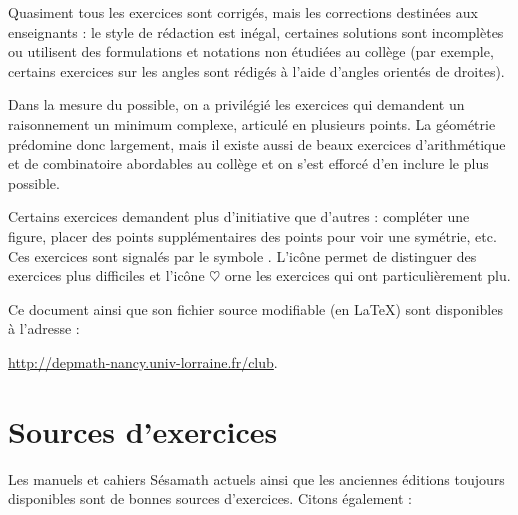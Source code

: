 Quasiment tous les exercices sont corrigés, mais les corrections destinées aux enseignants : le style de rédaction est inégal, certaines solutions sont incomplètes ou utilisent des formulations et notations non étudiées au collège (par exemple, certains exercices sur les angles sont rédigés à l'aide d'angles orientés de droites).


Dans la mesure du possible, on a privilégié les exercices qui demandent un raisonnement un minimum complexe, articulé en plusieurs points. La géométrie prédomine donc largement, mais il existe aussi de beaux exercices d'arithmétique et de combinatoire abordables au collège et on s'est efforcé d'en inclure le plus possible. 


Certains exercices demandent plus d'initiative que d'autres : compléter une figure, placer des points supplémentaires des points pour voir une symétrie, etc. Ces exercices sont signalés par le symbole \faLightbulbO. L'icône \faCogs{} permet de distinguer des exercices plus difficiles et l'icône $\heartsuit$ orne les exercices qui ont particulièrement plu.



Ce document ainsi que son fichier source modifiable (en \LaTeX) sont disponibles à l'adresse :

\url{http://depmath-nancy.univ-lorraine.fr/club}.
 

\section{Sources d'exercices}

Les manuels et cahiers Sésamath actuels ainsi que les anciennes éditions toujours disponibles sont de bonnes sources d'exercices. Citons également :


